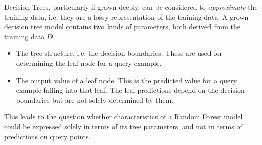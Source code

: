 \documentclass[../main.tex]{subfiles}
\begin{document}
Decision Trees, particularly if grown deeply, can be considered to \textit{approximate} the training data, i.e. they are a lossy representation of the training data. A grown decision tree model contains two kinds of parameters, both derived from the training data $D$.
\begin{itemize}
\item The tree structure, i.e. the decision boundaries. These are used for determining the leaf node for a query example.
\item The output value of a leaf node. This is the predicted value for a query example falling into that leaf. The leaf predictions depend on the decision boundaries but are not solely determined by them. 
\end{itemize}
This leads to the question whether characteristics of a Random Forest model could be expressed solely in terms of its tree parameters, and not in terms of predictions on query points.
\end{document}
